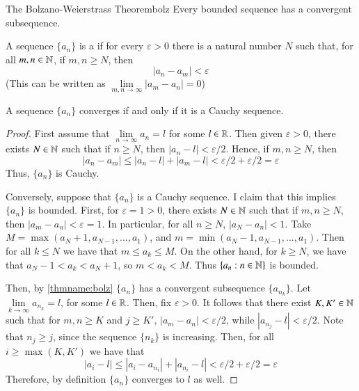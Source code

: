 \documentclass[12pt, a4paper, oneside, openright, titlepage]{book}
\begin{document}
\begin{cor}{The Bolzano-Weierstrass Theorem}{bolz}
    Every bounded sequence has a convergent subsequence.
\end{cor}


\begin{defn}
    A sequence $\{a_n\}$ is a  if for every $\varepsilon > 0$ there is a natural number $N$ such that, for all $m,n \in \mathbb N$, if $m,n \geq N$, then \begin{equation*}
        |a_n-a_m| <\varepsilon
    \end{equation*}
    (This can be written as $\lim\limits_{m,n\rightarrow \infty}|a_m-a_n| = 0$)
\end{defn}


\begin{thm}
    A sequence $\{a_n\}$ converges if and only if it is a Cauchy sequence.
\end{thm}
\begin{proof}
    First assume that $\lim\limits_{n\rightarrow \infty}a_n = l$ for some $l \in \mathbb R$. Then given $\varepsilon > 0$, there exists $N \in \mathbb N$ such that if $n \geq N$, then $|a_n - l| < \varepsilon/2$. Hence, if $m,n \geq N$, then $$|a_n - a_m| \leq |a_n - l| + |a_m-l| < \varepsilon/2+\varepsilon/2 = \varepsilon$$
    Thus, $\{a_n\}$ is Cauchy.

    Conversely, suppose that $\{a_n\}$ is a Cauchy sequence. I claim that this implies $\{a_n\}$ is bounded. First, for $\varepsilon = 1 > 0$, there exists $N \in \mathbb N$ such that if $m,n \geq N$, then $|a_m-a_n| < \varepsilon = 1$. In particular, for all $n \geq N$, $|a_N - a_n| < 1$. Take $M = \max(a_N + 1, a_{N-1},...,a_1)$, and $m = \min(a_N - 1, a_{N-1},...,a_1)$. Then for all $k \leq N$ we have that $m \leq a_k \leq M$. On the other hand, for $k \geq N$, we have that $a_N - 1 < a_k < a_N + 1$, so $m < a_k < M$. Thus $\{a_n:n \in \mathbb N\}$ is bounded. 

    Then, by \ref{thmname:bolz} $\{a_n\}$ has a convergent subsequence $\{a_{n_k}\}$. Let $\lim\limits_{k\rightarrow \infty}a_{n_k} = l$, for some $l \in \mathbb R$. Then, fix $\varepsilon > 0$. It follows that there exist $K, K' \in \mathbb N$ such that for $m,n \geq K$ and $j \geq K'$, $|a_m - a_n| < \varepsilon/2$, while $|a_{n_j} - l| < \varepsilon/2$. Note that $n_j \geq j$, since the sequence $\{n_k\}$ is increasing. Then, for all $i \geq \max(K,K')$ we have that \begin{equation*}
        |a_i - l| \leq |a_i - a_{n_i}| + |a_{n_i} - l| < \varepsilon/2 + \varepsilon/2 = \varepsilon
    \end{equation*}
    Therefore, by definition $\{a_n\}$ converges to $l$ as well.
\end{proof}
\end{document}
